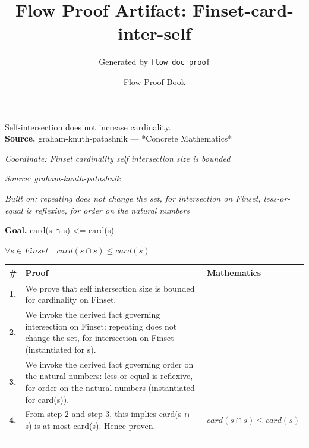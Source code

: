\documentclass[11pt]{article}
\title{Flow Proof Artifact: Finset-card-inter-self}
\author{Generated by \texttt{flow doc proof}}
\date{Flow Proof Book}
\theoremstyle{definition}
\begin{document}
\maketitle
Self-intersection does not increase cardinality.\\[0.5em]
\textbf{Source.} graham-knuth-patashnik — *Concrete Mathematics*\\[0.5em]
\bigskip
{}\par
\smallskip\noindent\textit{Coordinate: Finset \cdot cardinality \cdot self intersection size is bounded}\par
\smallskip\noindent\textit{Source: graham-knuth-patashnik}\par
\smallskip\noindent\textit{Built on: repeating does not change the set, for intersection on Finset, less-or-equal is reflexive, for order on the natural numbers}\par
\medskip
\noindent\textbf{Goal.} card(s ∩ s) <= card(s)\par
\noindent$\displaystyle \forall s \in Finset\quad card(s ∩ s) \le card(s)$\par
\medskip
\noindent
\begin{tabular}{@{} >{\raggedright\arraybackslash}p{} >{\raggedright\arraybackslash}p{} >{\raggedleft\arraybackslash}p{} @{}}
\textbf{\#} & \textbf{Proof} & \textbf{Mathematics} \\
\midrule
\textbf{1.} & We prove that self intersection size is bounded for cardinality on Finset. & \\[0.45em]
\textbf{2.} & We invoke the derived fact governing intersection on Finset: repeating does not change the set, for intersection on Finset (instantiated for s). & \\[0.45em]
\textbf{3.} & We invoke the derived fact governing order on the natural numbers: less-or-equal is reflexive, for order on the natural numbers (instantiated for card(s)). & \\[0.45em]
\textbf{4.} & From step 2 and step 3, this implies card(s ∩ s) is at most card(s). Hence proven. & $\displaystyle card(s ∩ s) \le card(s)$ \\[0.45em]
\bottomrule
\end{tabular}
\label{thm:Finset-cardinality-self_intersection_size_is_bounded}
\par\medskip\hrule
\end{document}
